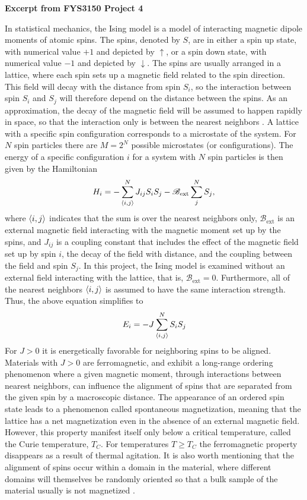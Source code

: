 \textbf{Excerpt from FYS3150 Project 4}

In statistical mechanics, the Ising model is a model of interacting magnetic dipole moments of atomic spins. The spins, denoted by $S$, are in either a spin up state, with numerical value $+1$ and depicted by $\uparrow$, or a spin down state, with numerical value $- 1$ and depicted by $\downarrow$. The spins are usually arranged in a lattice, where each spin sets up a magnetic field related to the spin direction. This field will decay with the distance from spin $S_i$, so the interaction between spin $S_i$ and $S_j$ will therefore depend on the distance between the spins. As an approximation, the decay of the magnetic field will be assumed to happen rapidly in space, so that the interaction only is between the nearest neighbors \cite[p. 211-212]{Malthe}. A lattice with a specific spin configuration corresponds to a microstate of the system. For $N$ spin particles there are $M=2^N$ possible microstates (or configurations). The energy of a specific configuration $i$ for a system with $N$ spin particles is then given by the Hamiltonian \cite[p. 421]{MHJ}
\begin{equation*}
    H_i = - \sum_{\ev{i,j}}^N J_{ij} S_i S_j - \mathcal{B}_\mathrm{ext} \sum_{j}^N S_j ,
\end{equation*}
where $\ev{i,j}$ indicates that the sum is over the nearest neighbors only, $\mathcal{B}_\mathrm{ext}$ is an external magnetic field interacting with the magnetic moment set up by the spins, and $J_{ij}$ is a coupling constant that includes the effect of the magnetic field set up by spin $i$, the decay of the field with distance, and the coupling between the field and spin $S_j$. In this project, the Ising model is examined without an external field interacting with the lattice, that is, $\mathcal{B}_\mathrm{ext}=0$. Furthermore, all of the nearest neighbors $\ev{i,j}$ is assumed to have the same interaction strength. Thus, the above equation simplifies to
\begin{equation}\label{eq:ising energy}
    E_i = - J \sum_{\ev{i,j}}^N S_i S_j
\end{equation}
For $J>0$ it is energetically favorable for neighboring spins to be aligned. Materials with $J>0$ are ferromagnetic, and exhibit a long-range ordering phenomenon where a given magnetic moment, through interactions between nearest neighbors, can influence the alignment of spins that are separated from the given spin by a macroscopic distance. The appearance of an ordered spin state leads to a phenomenon called spontaneous magnetization, meaning that the lattice has a net magnetization even in the absence of an external magnetic field. However, this property manifest itself only below a critical temperature, called the Curie temperature, $T_C$. For temperatures $T\geq T_C$ the ferromagnetic property disappears as a result of thermal agitation. It is also worth mentioning that the alignment of spins occur within a domain in the material, where different domains will themselves be randomly oriented so that a bulk sample of the material usually is not magnetized \cite[p. 421-422]{MHJ}\cite{HyperPhys}.

